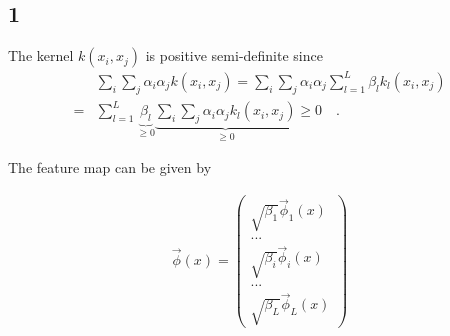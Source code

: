 \subsection*{1}
The kernel $k(x_i, x_j)$ is positive semi-definite since
\begin{align*}
	&\sum_i \sum_j \alpha_i \alpha_j k(x_i, x_j) = 
	\sum_i \sum_j \alpha_i \alpha_j \sum_{l=1}^L \beta_l k_l(x_i, x_j)\\
	=&\sum_{l=1}^L \underbrace{\beta_l}_{\geq 0} \underbrace{\sum_i \sum_j \alpha_i \alpha_j k_l(x_i, x_j)}_{\geq 0} \geq 0 \quad .
\end{align*}

The feature map can be given by 

\begin{align*}
	\vec{\phi}(x) =
	\begin{pmatrix}
	\sqrt{\beta_1}\vec{\phi}_1(x)\\
	...\\
	\sqrt{\beta_i}\vec{\phi}_i(x)\\
	...\\
	\sqrt{\beta_L}\vec{\phi}_L(x)
	\end{pmatrix}
\end{align*}